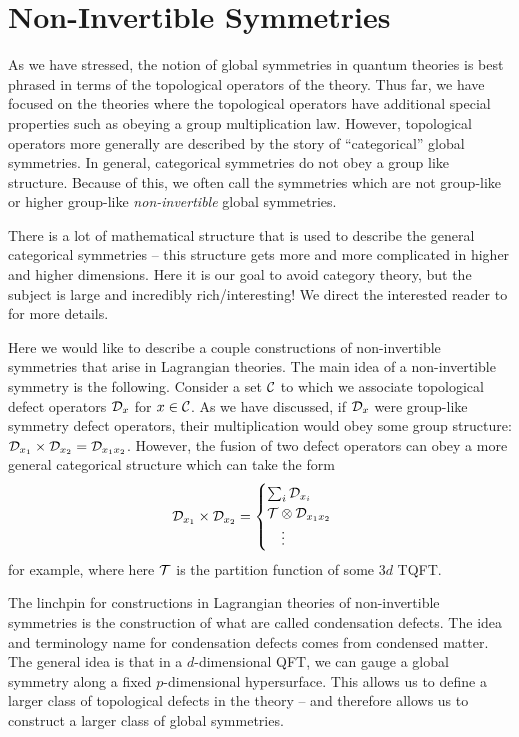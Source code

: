 \documentclass[11pt]{article}
\newcommand{\eq}[1]{\begin{align}\begin{split}#1\end{split}\end{align}}
\def\CC {{\cal C}}
\def\CD {{\cal D}}
\def\CT {{\cal T}}
\begin{document}
\section{Non-Invertible Symmetries}
\label{sec:NIS}

As we have stressed, the notion of global symmetries in quantum theories is best phrased in terms of the topological operators of the theory. Thus far, we have focused on the theories where the topological operators have additional special properties such as obeying a group multiplication law. However, topological operators more generally are described by the  story of ``categorical'' global symmetries. In general, categorical symmetries do not obey a group like structure. Because of this, we often call the symmetries which are not group-like or higher group-like \emph{non-invertible} global symmetries. 

There is a lot of mathematical structure that is used to describe the general categorical symmetries -- this structure gets more and more complicated in higher and higher dimensions. Here it is our goal to avoid category theory, but the subject is large and incredibly rich/interesting! We direct the interested reader to \cite{Bhardwaj:2023ayw,Bartsch:2023wvv,Schafer-Nameki:2023jdn,Bhardwaj:2022lsg,Bhardwaj:2022yxj,Bartsch:2022ytj,Bartsch:2022mpm,Freed:2022qnc,Freed:2022iao,Kaidi:2022cpf,Choi:2022jqy,Choi:2022zal,Choi:2022fgx,Choi:2022rfe,Cordova:2022ieu,Bhardwaj:2022kot,Bhardwaj:2022maz} for more details.

Here we would like to describe a couple constructions of non-invertible symmetries that arise in Lagrangian theories. The main idea of a non-invertible symmetry is the following. Consider a set $\CC$  to which we associate topological defect operators $\CD_x$ for $x \in \CC$. As we have discussed, if $\CD_x$ were group-like symmetry defect operators, their multiplication would obey some group structure: $\CD_{x_1}\times \CD_{x_2}=\CD_{x_1x_2}$. However, the fusion of two defect operators can obey a more general categorical structure which can take the form 
\eq{
\CD_{x_1}\times \CD_{x_2}=\begin{cases}
\sum_i \CD_{x_i}\\
\CT\otimes \CD_{x_1x_2}\\
\quad\vdots
\end{cases}
}
for example, where here $\CT$ is the partition function of some $3d$ TQFT.
 

The linchpin for constructions  in Lagrangian theories of non-invertible symmetries is the construction of what are called condensation defects.  The idea and terminology name for condensation defects comes from condensed matter.  The general idea is that in a $d$-dimensional QFT, we can gauge a global symmetry along a fixed $p$-dimensional hypersurface.  This allows us to define a larger class of topological defects in the theory -- and therefore allows us to construct a larger class of global symmetries. 
\end{document}
